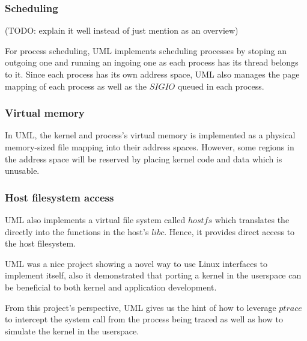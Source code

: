 \subsubsection{Scheduling}

(TODO: explain it well instead of just mention as an overview)

For process scheduling, UML implements scheduling processes by stoping an outgoing one and running an ingoing one as each process has its thread belongs to it. Since each process has its own address space, UML also manages the page mapping of each process as well as the $SIGIO$ queued in each process.

\subsubsection{Virtual memory}

In UML, the kernel and process's virtual memory is implemented as a physical memory-sized file mapping into their address spaces. However, some regions in the address space will be reserved by placing kernel code and data which is unusable.

\subsubsection{Host filesystem access}

UML also implements a virtual file system called $hostfs$ which translates the directly into the functions in the host's $libc$. Hence, it provides direct access to the host filesystem.

UML was a nice project showing a novel way to use Linux interfaces to implement itself, also it demonstrated that porting a kernel in the userspace can be beneficial to both kernel and application development.

From this project's perspective, UML gives us the hint of how to leverage $ptrace$ to intercept the system call from the process being traced as well as how to simulate the kernel in the userspace.




